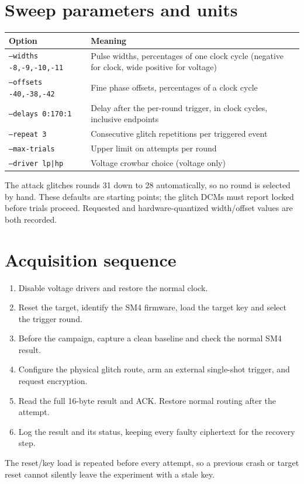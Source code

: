 \section{Sweep parameters and units}
\begin{center}\begin{tabular}{P{.34\linewidth}P{.54\linewidth}}\toprule
Option & Meaning\\\midrule
\texttt{--widths -8,-9,-10,-11} & Pulse widths, percentages of one clock cycle (negative for clock, wide positive for voltage)\\
\texttt{--offsets -40,-38,-42} & Fine phase offsets, percentages of a clock cycle\\
\texttt{--delays 0:170:1} & Delay after the per-round trigger, in clock cycles, inclusive endpoints\\
\texttt{--repeat 3} & Consecutive glitch repetitions per triggered event\\
\texttt{--max-trials} & Upper limit on attempts per round\\
\texttt{--driver lp|hp} & Voltage crowbar choice (voltage only)\\\bottomrule
\end{tabular}\end{center}
The attack glitches rounds 31 down to 28 automatically, so no round is selected by hand. These defaults are starting points; the glitch DCMs must report locked before trials proceed. Requested and hardware-quantized width/offset values are both recorded.
\section{Acquisition sequence}
\begin{enumerate}
\item Disable voltage drivers and restore the normal clock.
\item Reset the target, identify the SM4 firmware, load the target key and select the trigger round.
\item Before the campaign, capture a clean baseline and check the normal SM4 result.
\item Configure the physical glitch route, arm an external single-shot trigger, and request encryption.
\item Read the full 16-byte result and ACK. Restore normal routing after the attempt.
\item Log the result and its status, keeping every faulty ciphertext for the recovery step.
\end{enumerate}
The reset/key load is repeated before every attempt, so a previous crash or target reset cannot silently leave the experiment with a stale key.
